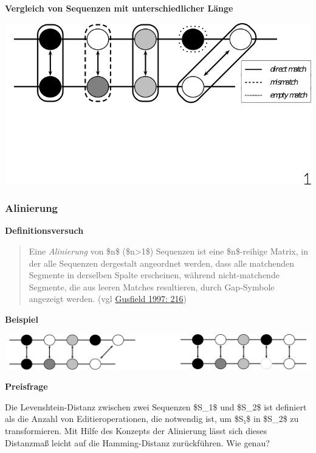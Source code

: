 \par\noindent\textbf{Vergleich von Sequenzen mit unterschiedlicher Länge}

\includegraphics[width=\textwidth]{img/matchings.png}


\subsubsection{\texorpdfstring{{Alinierung}}{Alinierung}}

\par\noindent\textbf{Definitionsversuch}

\begin{quote}
Eine \emph{Alinierung} von \$n\$ (\$n\textgreater{}1\$) Sequenzen ist
eine \$n\$-reihige Matrix, in der alle Sequenzen dergestalt angeordnet
werden, dass alle matchenden Segmente in derselben Spalte erscheinen,
während nicht-matchende Segmente, die aus leeren Matches resultieren,
durch Gap-Symbole angezeigt werden. (vgl
\href{http://bibliography.lingpy.org?key=Gusfield1997}{Gusfield 1997:
216})
\end{quote}



\par\noindent\textbf{Beispiel}

\includegraphics[width=\textwidth]{img/alignment.pdf}



\par\noindent\textbf{Preisfrage}

Die Levenshtein-Distanz zwischen zwei Sequenzen \$S\_1\$ und \$S\_2\$
ist definiert als die Anzahl von Editieroperationen, die notwendig ist,
um \$S₁\$ in \$S\_2\$ zu transformieren. Mit Hilfe des Konzepts der
Alinierung lässt sich dieses Distanzmaß leicht auf die Hamming-Distanz
zurückführen. Wie genau?


